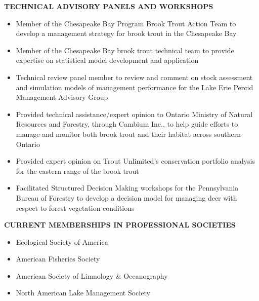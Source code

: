 \documentclass[10pt]{article}
\begin{document}
\centerline {\bf{TECHNICAL ADVISORY PANELS AND WORKSHOPS}}
\vspace{5pt}
\begin{itemize}
\item Member of the Chesapeake Bay Program Brook Trout Action Team to develop a management strategy for brook trout in the Chesapeake Bay
\item Member of the Chesapeake Bay brook trout technical team to provide expertise on statistical model development and application
\item Technical review panel member to review and comment on stock assessment and simulation models of management performance for the Lake Erie Percid Management Advisory Group
\item Provided technical assistance/expert opinion to Ontario Ministry of Natural Resources and Forestry, through Cambium Inc., to help guide efforts to manage and monitor both brook trout and their habitat across southern Ontario
\item Provided expert opinion on Trout Unlimited's conservation portfolio analysis for the eastern range of the brook trout
\item Facilitated Structured Decision Making workshops for the Pennsylvania Bureau of Forestry to develop a decision model for managing deer with respect to forest vegetation conditions
\end{itemize}

\centerline {\bf{CURRENT MEMBERSHIPS IN PROFESSIONAL SOCIETIES}}
\vspace{5pt}
\begin{itemize}
\item Ecological Society of America
\item American Fisheries Society
\item American Society of Limnology \& Oceanography
\item North American Lake Management Society
\end{itemize}
\end{document}
